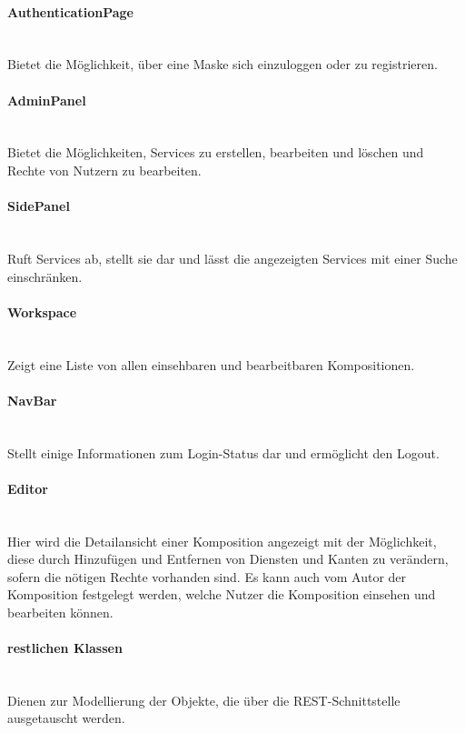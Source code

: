\paragraph{AuthenticationPage}\mbox{}\\
Bietet die Möglichkeit, über eine Maske sich einzuloggen oder zu registrieren.
\paragraph{AdminPanel}\mbox{}\\
Bietet die Möglichkeiten, Services zu erstellen, bearbeiten und löschen und Rechte von Nutzern zu bearbeiten. 
\paragraph{SidePanel}\mbox{}\\
Ruft Services ab, stellt sie dar und lässt die angezeigten Services mit einer Suche einschränken. 
\paragraph{Workspace}\mbox{}\\
Zeigt eine Liste von allen einsehbaren und bearbeitbaren Kompositionen. 
\paragraph{NavBar}\mbox{}\\
Stellt einige Informationen zum Login-Status dar und ermöglicht den Logout.
\paragraph{Editor}\mbox{}\\
Hier wird die Detailansicht einer Komposition angezeigt mit der Möglichkeit, diese durch Hinzufügen und Entfernen von
Diensten und Kanten zu verändern, sofern die nötigen Rechte vorhanden sind. Es kann auch vom Autor der Komposition festgelegt
werden, welche Nutzer die Komposition einsehen und bearbeiten können. 
\paragraph{restlichen Klassen}\mbox{}\\
Dienen zur Modellierung der Objekte, die über die REST-Schnittstelle ausgetauscht werden. 
